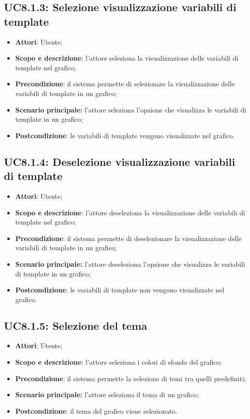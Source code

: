 \subsection{UC8.1.3: Selezione visualizzazione variabili di template}
\hypertarget{UC8.1.3}{}
\begin{itemize}
	\item \textbf{Attori}: Utente;
	\item \textbf{Scopo e descrizione}: l'attore seleziona la visualizzazione delle variabili di template nel grafico;
	\item \textbf{Precondizione}: il sistema permette di selezionare la visualizzazione delle variabili di template in un grafico;
	\item \textbf{Scenario principale:} l'attore seleziona l'opzione che visualizza le variabili di template in un grafico;
	\item \textbf{Postcondizione}: le variabili di template vengono visualizzate nel grafico.
\end{itemize}

\subsection{UC8.1.4: Deselezione visualizzazione variabili di template}
\hypertarget{UC8.1.4}{}
\begin{itemize}
	\item \textbf{Attori}: Utente;
	\item \textbf{Scopo e descrizione}: l'attore deseleziona la visualizzazione delle variabili di template nel grafico;
	\item \textbf{Precondizione}: il sistema permette di deselezionare la visualizzazione delle variabili di template in un grafico;
	\item \textbf{Scenario principale:} l'attore deseleziona l'opzione che visualizza le variabili di template in un grafico;
	\item \textbf{Postcondizione}: le variabili di template non vengono visualizzate nel grafico.
\end{itemize}

\subsection{UC8.1.5: Selezione del tema}
\hypertarget{UC8.1.5}{}
\begin{itemize}
	\item \textbf{Attori}: Utente;
	\item \textbf{Scopo e descrizione}: l'attore seleziona i colori di sfondo del grafico; 
	\item \textbf{Precondizione}: il sistema permette la selezione di temi tra quelli predefiniti;
	\item \textbf{Scenario principale:} l'attore seleziona il tema di un grafico;
	\item \textbf{Postcondizione}: il tema del grafico viene selezionato.
\end{itemize}

